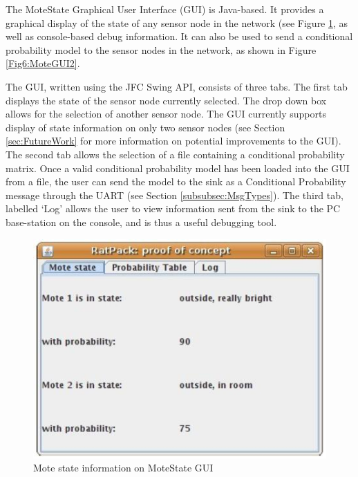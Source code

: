 \documentclass{sig-alternate-10pt}
\begin{document}
The MoteState Graphical User Interface (GUI) is Java-based. It provides a graphical
display of the
state of any sensor node in the network (see Figure \ref{Fig5:MoteGUI1}, as well as console-based debug information. It can also be used to send a conditional probability model to the sensor nodes in the network, as shown in Figure \ref{Fig6:MoteGUI2}.

The GUI, written using the JFC Swing API, consists of three tabs. The first tab displays the state of the sensor node currently selected. The drop down box allows for the selection of another sensor node. The GUI currently supports display of state information on only two sensor nodes (see Section \ref{sec:FutureWork} for more information on potential improvements to the GUI). The second tab allows the selection of a file containing a conditional probability matrix. Once a valid conditional probability model has been loaded into the GUI from a file, the user can send the model to the sink as a Conditional Probability message through the UART (see Section \ref{subsubsec:MsgTypes}). The third tab, labelled `Log' allows the user to view information sent from the sink to the PC base-station on the console, and is thus a useful debugging tool.

  \begin{figure}[h]
\centering
\includegraphics[scale=0.5]{img/MoteGUI1.png}
\caption{Mote state information on MoteState GUI} 
\label{Fig5:MoteGUI1}
\end{figure}  
\end{document}
